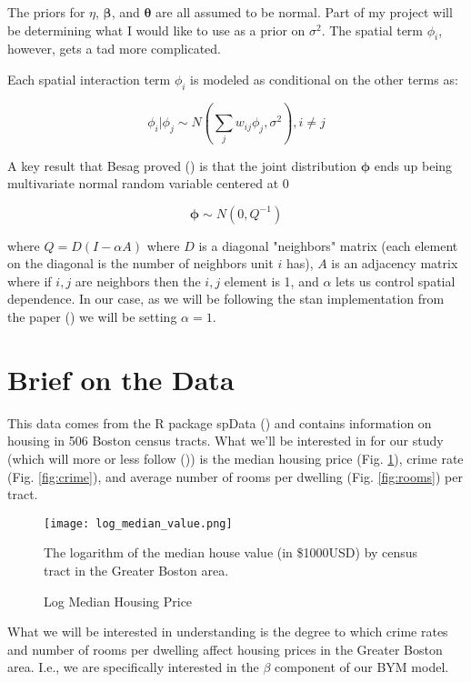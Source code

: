\documentclass[11pt]{article}
\begin{document}
The priors for $\eta$, $\bm{\beta}$, and $\bm{\theta}$ are all assumed to be normal. Part of my project will be determining what I would like to use as a prior on $\sigma^2$. The spatial term $\phi_i$, however, gets a tad more complicated. 

Each spatial interaction term $\phi_i$ is modeled as conditional on the other terms as:

$$\phi_i | \phi_j \sim N\left(\sum_j w_{ij}\phi_j, \sigma^2  \right), i\neq j$$

A key result that Besag proved (\cite{besag}) is that the joint distribution $\bm{\phi}$ ends up being multivariate normal random variable centered at 0

$$\bm{\phi}\sim N(0, Q^{-1})$$

where $Q=D(I-\alpha A)$ where $D$ is a diagonal "neighbors" matrix (each element on the diagonal is the number of neighbors unit $i$ has), $A$ is an adjacency matrix where if $i,j$ are neighbors then the $i,j$ element is 1, and $\alpha$ lets us control spatial dependence. In our case, as we will be following the stan implementation from the paper (\cite{bymstan}) we will be setting $\alpha=1$. 

\newpage

\section{Brief on the Data}

This data comes from the R package spData (\cite{spdata}) and contains information on housing in 
506 Boston census tracts. What we'll be interested in for our study (which will more or less follow (\cite{book})) is the median housing price (Fig. \ref{fig:prices}), crime rate (Fig. \ref{fig:crime}), and average number of rooms per dwelling (Fig. \ref{fig:rooms}) per tract.  

\begin{figure}[h!] 
  \texttt{[image: log\_median\_value.png]}
  \caption{Log Median Housing Price}
  \medskip
	\small
	The logarithm of the median house value (in \$1000USD) by census tract in the Greater Boston area.
  \label{fig:prices}
\end{figure}

What we will be interested in understanding is the degree to which crime rates and number of rooms per dwelling affect housing prices in the Greater Boston area. I.e., we are specifically interested in the $\beta$ component of our BYM model.
\end{document}
